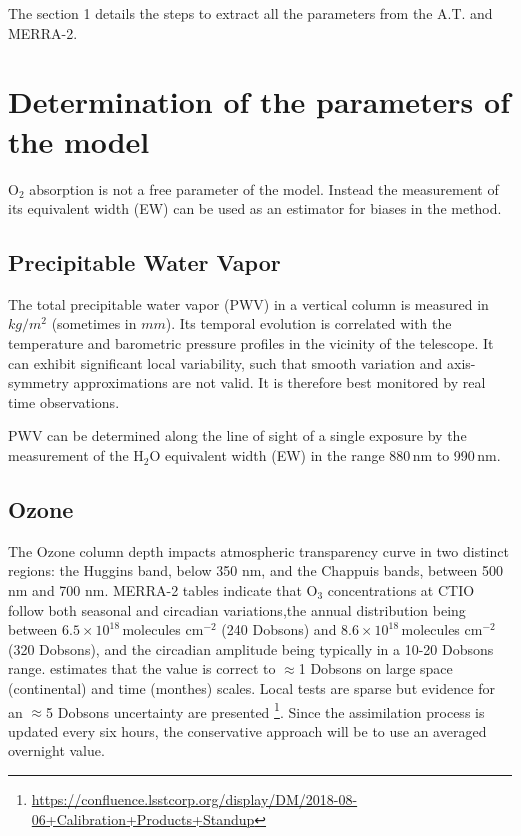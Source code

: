 \documentclass[DM,authoryear,toc,lsstdraft]{lsstdoc}
\begin{document}
The section 1 details the steps to extract all the parameters from the A.T. and MERRA-2.


\section{Determination of the parameters of the model}


$\textrm{O}_2$ absorption is not a free parameter of the model. Instead the measurement of its equivalent width (EW) can be used as an estimator for biases in the method.


\subsection{Precipitable Water Vapor}


The total precipitable water vapor (PWV) in a vertical column is measured in $kg/m^2$ (sometimes in $mm$).  Its temporal evolution is correlated with the temperature and barometric pressure profiles in the vicinity of the telescope. It can exhibit significant local variability, such that smooth variation and axis-symmetry approximations are not valid. It is therefore best monitored by real time observations.

PWV can be determined along the line of sight of a single exposure by the measurement of the H$_2$O equivalent width (EW) in the range 880\,nm to 990\,nm.  


\subsection{Ozone}


The Ozone column depth impacts atmospheric transparency curve in two distinct regions: the Huggins band, below 350 nm, and the Chappuis bands, between 500 nm and 700 nm.
MERRA-2 tables indicate that O$_3$ concentrations at CTIO follow both seasonal and circadian variations,the annual distribution being between $6.5  \times  10^{18}$\,molecules cm$^{-2}$ (240 Dobsons) and $8.6  \times  10^{18}$\,molecules cm$^{-2}$ (320 Dobsons), and the circadian amplitude being typically in a 10-20 Dobsons range. \cite{doi:10.1002/2013JD020914} estimates that the value is correct to $\approx$1 Dobsons on large space (continental) and time (monthes) scales. Local tests are sparse but evidence for an $\approx$5 Dobsons uncertainty are presented \footnote{\url{https://confluence.lsstcorp.org/display/DM/2018-08-06+Calibration+Products+Standup}}. Since the assimilation process is updated every six hours, the conservative approach will be to use an averaged overnight value. 
\end{document}
